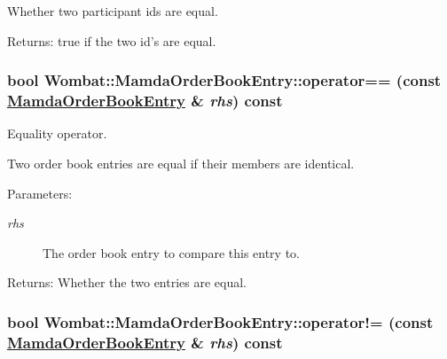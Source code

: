 Whether two participant ids are equal. 

\begin{Desc}
\item[Returns:]true if the two id's are equal. \end{Desc}
\hypertarget{classWombat_1_1MamdaOrderBookEntry_321cbae34ac538e2afe23be61c7c9d63}{
\subsubsection[operator==]{\setlength{\rightskip}{0pt plus 5cm}bool Wombat::Mamda\-Order\-Book\-Entry::operator== (const \hyperlink{classWombat_1_1MamdaOrderBookEntry}{Mamda\-Order\-Book\-Entry} \& {\em rhs}) const}}
\label{classWombat_1_1MamdaOrderBookEntry_321cbae34ac538e2afe23be61c7c9d63}


Equality operator. 

Two order book entries are equal if their members are identical.

\begin{Desc}
\item[Parameters:]
\begin{description}
\item[{\em rhs}]The order book entry to compare this entry to.\end{description}
\end{Desc}
\begin{Desc}
\item[Returns:]Whether the two entries are equal. \end{Desc}
\hypertarget{classWombat_1_1MamdaOrderBookEntry_d39539dde14628be1035513ed5c57b03}{
\subsubsection[operator"!=]{\setlength{\rightskip}{0pt plus 5cm}bool Wombat::Mamda\-Order\-Book\-Entry::operator!= (const \hyperlink{classWombat_1_1MamdaOrderBookEntry}{Mamda\-Order\-Book\-Entry} \& {\em rhs}) const}}
\label{classWombat_1_1MamdaOrderBookEntry_d39539dde14628be1035513ed5c57b03}


